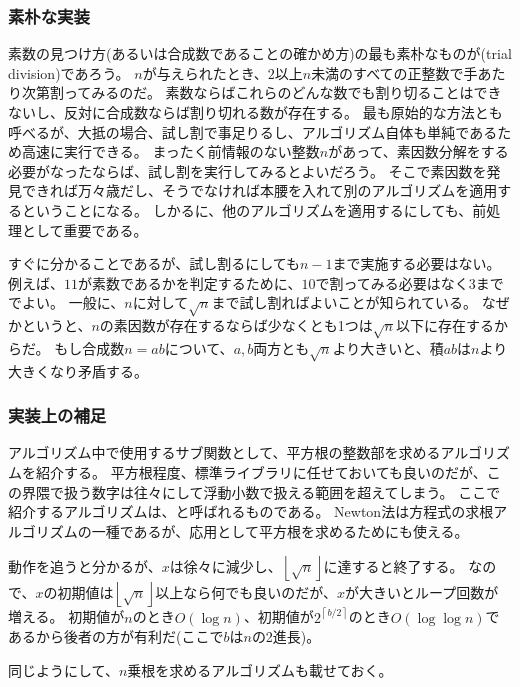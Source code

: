 \subsubsection{素朴な実装}
\label{sssec:trial_division_simple}
素数の見つけ方(あるいは合成数であることの確かめ方)の最も素朴なものが(trial division)であろう。
$n$が与えられたとき、$2$以上$n$未満のすべての正整数で手あたり次第割ってみるのだ。
素数ならばこれらのどんな数でも割り切ることはできないし、反対に合成数ならば割り切れる数が存在する。
最も原始的な方法とも呼べるが、大抵の場合、試し割で事足りるし、アルゴリズム自体も単純であるため高速に実行できる。
まったく前情報のない整数$n$があって、素因数分解をする必要がなったならば、試し割を実行してみるとよいだろう。
そこで素因数を発見できれば万々歳だし、そうでなければ本腰を入れて別のアルゴリズムを適用するということになる。
しかるに、他のアルゴリズムを適用するにしても、前処理として重要である。

すぐに分かることであるが、試し割るにしても$n-1$まで実施する必要はない。
例えば、$11$が素数であるかを判定するために、$10$で割ってみる必要はなく$3$まででよい。
一般に、$n$に対して$\sqrt{n}$まで試し割ればよいことが知られている。
なぜかというと、$n$の素因数が存在するならば少なくとも1つは$\sqrt{n}$以下に存在するからだ。
もし合成数$n=ab$について、$a,b$両方とも$\sqrt{n}$より大きいと、積$ab$は$n$より大きくなり矛盾する。


\subsubsection{実装上の補足}
アルゴリズム中で使用するサブ関数として、平方根の整数部を求めるアルゴリズムを紹介する。
平方根程度、標準ライブラリに任せておいても良いのだが、この界隈で扱う数字は往々にして浮動小数で扱える範囲を超えてしまう。
ここで紹介するアルゴリズムは、と呼ばれるものである。
Newton法は方程式の求根アルゴリズムの一種であるが、応用として平方根を求めるためにも使える。

動作を追うと分かるが、$x$は徐々に減少し、$\left \lfloor\sqrt{n}\right \rfloor$に達すると終了する。
なので、$x$の初期値は$\left \lfloor\sqrt{n}\right \rfloor$以上なら何でも良いのだが、$x$が大きいとループ回数が増える。
初期値が$n$のとき$O(\log{n})$、初期値が$2^{\left \lceil b/2 \right \rceil}$のとき$O(\log\log{n})$であるから後者の方が有利だ(ここで$b$は$n$の2進長)。


同じようにして、$n$乗根を求めるアルゴリズムも載せておく。

